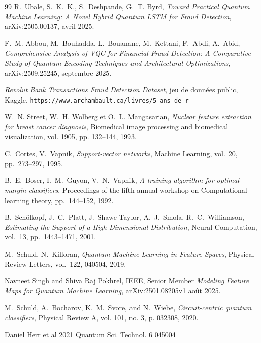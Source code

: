 \documentclass[a4paper]{article}
\begin{document}
\begin{thebibliography}{99}
 R.~Ubale, S.~K.~K., S.~Deshpande, G.~T. Byrd, \textit{Toward Practical Quantum Machine Learning: A Novel Hybrid Quantum LSTM for Fraud Detection}, arXiv:2505.00137, avril 2025.

 F.~M. Abbou, M.~Bouhadda, L.~Bouanane, M.~Kettani, F.~Abdi, A.~Abid, \textit{Comprehensive Analysis of VQC for Financial Fraud Detection: A Comparative Study of Quantum Encoding Techniques and Architectural Optimizations}, arXiv:2509.25245, septembre 2025.

 \textit{Revolut Bank Transactions Fraud Detection Dataset}, jeu de données public, Kaggle. \texttt{https://www.archambault.ca/livres/5-ans-de-r}%


W.~N. Street, W.~H. Wolberg et O.~L. Mangasarian, \textit{Nuclear feature extraction for breast cancer diagnosis}, Biomedical image processing and biomedical visualization, vol. 1905, pp. 132--144, 1993.

 C.~Cortes, V.~Vapnik, \textit{Support-vector networks}, Machine Learning, vol.~20, pp.~273--297, 1995.

 B.~E.~Boser, I.~M.~Guyon, V.~N.~Vapnik, \textit{A training algorithm for optimal margin classifiers}, Proceedings of the fifth annual workshop on Computational learning theory, pp.~144--152, 1992.

 B.~Schölkopf, J.~C.~Platt, J.~Shawe-Taylor, A.~J.~Smola, R.~C.~Williamson, \textit{Estimating the Support of a High-Dimensional Distribution}, Neural Computation, vol.~13, pp.~1443--1471, 2001.

 M.~Schuld, N.~Killoran, \textit{Quantum Machine Learning in Feature Spaces}, Physical Review Letters, vol.~122, 040504, 2019.

 Navneet Singh and Shiva Raj Pokhrel, IEEE, Senior Member \textit{Modeling Feature Maps for Quantum Machine
Learning}, arXiv:2501.08205v1 août 2025.

 M.~Schuld, A.~Bocharov, K.~M.~Svore, and N.~Wiebe, \textit{Circuit-centric quantum classifiers}, Physical Review A, vol. 101, no. 3, p. 032308,
2020.

 Daniel Herr et al 2021 Quantum Sci. Technol. 6 045004


\end{thebibliography}
\end{document}
